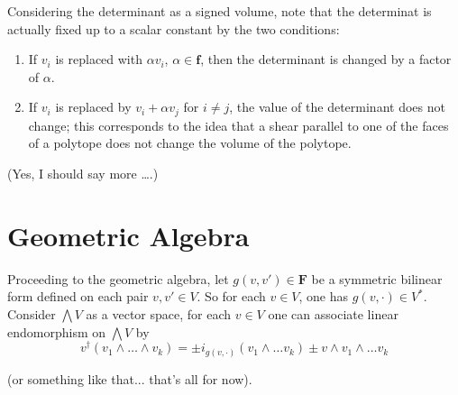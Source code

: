 \documentclass{article}
\begin{document}
Considering the determinant as a signed volume, note that the determinat is actually fixed
up to a scalar constant by the two conditions:
\begin{enumerate}
\item If $v_i$ is replaced with $\alpha v_i$, $\alpha \in \mathbf{f}$, 
then the determinant is changed by a factor of $\alpha$.
\item If $v_i$ is replaced by $v_i + \alpha v_j$ for $i \ne j$, the value of the 
determinant does not change; this corresponds to the idea that a shear parallel to
one of the faces of a polytope does not change the volume of the polytope.
\end{enumerate}


(Yes, I should say more \ldots.)
\section{Geometric Algebra}
Proceeding to the geometric algebra, let $g(v,v')\in \mathbf{F}$ be a symmetric bilinear form
defined on each pair $v, v' \in V$.  So for each $v \in V$, one has $g(v,\cdot) \in V^*$.
Consider $\bigwedge V$ as a vector space, for each $v \in V$ one can associate linear endomorphism
on $\bigwedge V$ by 
\[
  v^\dagger (v_1 \wedge \ldots \wedge v_k) = \pm i_{g(v,\cdot)} (v_1 \wedge \ldots v_k)
                                          \pm v \wedge v_1 \wedge \ldots v_k
\]

(or something like that... that's all for now).
\end{document}
